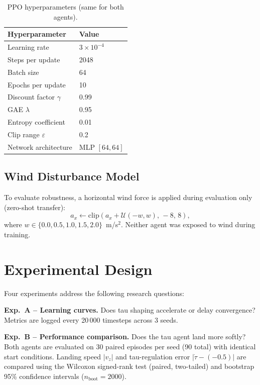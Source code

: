 \documentclass[10pt,twocolumn]{article}
\begin{document}
\begin{table}[h]
\centering
\caption{PPO hyperparameters (same for both agents).}
\label{tab:hyperparams}
\small
\begin{tabular}{ll}
\toprule
Hyperparameter & Value \\
\midrule
Learning rate            & $3 \times 10^{-4}$ \\
Steps per update         & 2048 \\
Batch size               & 64 \\
Epochs per update        & 10 \\
Discount factor $\gamma$ & 0.99 \\
GAE $\lambda$            & 0.95 \\
Entropy coefficient      & 0.01 \\
Clip range $\varepsilon$ & 0.2 \\
Network architecture     & MLP $[64, 64]$ \\
\bottomrule
\end{tabular}
\end{table}

\subsection{Wind Disturbance Model}

To evaluate robustness, a horizontal wind force is applied during evaluation
only (zero-shot transfer):
\begin{equation}
  a_x \leftarrow \mathrm{clip}\!\left(a_x + \mathcal{U}(-w,w),\,-8,\,8\right),
\end{equation}
where $w \in \{0.0,0.5,1.0,1.5,2.0\}$~m/s$^2$.
Neither agent was exposed to wind during training.

\section{Experimental Design}
\label{sec:experiments}

Four experiments address the following research questions:

\textbf{Exp.~A -- Learning curves.}
Does tau shaping accelerate or delay convergence?
Metrics are logged every 20\,000 timesteps across 3 seeds.

\textbf{Exp.~B -- Performance comparison.}
Does the tau agent land more softly?
Both agents are evaluated on 30 paired episodes per seed (90 total) with
identical start conditions.
Landing speed $|v_z|$ and tau-regulation error $|\dot{\tau}-(-0.5)|$ are
compared using the Wilcoxon signed-rank test (paired, two-tailed) and
bootstrap 95\% confidence intervals ($n_{\text{boot}}=2000$).
\end{document}
